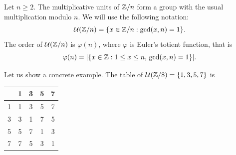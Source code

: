 \begin{example}
Let $n\geq2$. The multiplicative units of $\mathbb{Z}/n$ form a group 
with the usual multiplication modulo $n$. 
We will use the following notation:
\[
\mathcal{U}(\mathbb{Z}/n)=\{x\in\mathbb{Z}/n:\gcd(x,n)=1\}.
\]
The order of $\mathcal{U}(\mathbb{Z}/n)$ is $\varphi(n)$, where $\varphi$ 
is Euler's totient function, that is 
\[
\varphi(n)=|\{x\in\mathbb{Z}:1\leq x\leq n,\,\gcd(x,n)=1\}|.
\]

Let us show a concrete example. The table of 
$\mathcal{U}(\mathbb{Z}/8)=\{1,3,5,7\}$
is
\begin{center}
  \begin{tabular}{l|cccc}
     &1&3&5&7 \\
    \hline
    1 & 1 & 3 & 5 & 7\\
    3 & 3 & 1 & 7 & 5\\
    5 & 5 & 7 & 1 & 3\\
    7 & 7 & 5 & 3 & 1
  \end{tabular}
\end{center}
\end{example}

